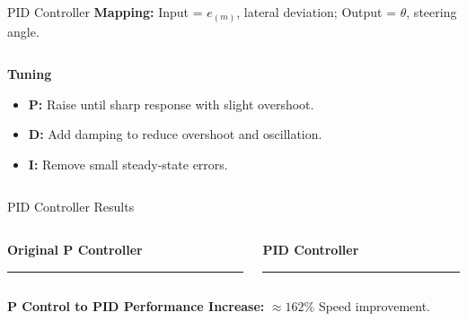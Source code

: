 \documentclass[aspectratio=169,12pt]{beamer}
\begin{document}
\begin{frame}[t]{PID Controller}
  \vspace*{-0.3em}
  \textbf{Mapping:} Input = \(e_{(m)}\), lateral deviation; Output = \(\theta\), steering angle.
  \vspace{0.4em}
  \begin{columns}[T]
    \begin{column}{0.52\textwidth}
      \textbf{Tuning}
      \begin{itemize}\setlength{\itemsep}{0.35em}
        \item \textbf{P:} Raise until sharp response with slight overshoot.
        \item \textbf{D:} Add damping to reduce overshoot and oscillation.
        \item \textbf{I:} Remove small steady-state errors.
      \end{itemize}

    \end{column}
    \begin{column}{0.48\textwidth}
      \centering

    \end{column}
  \end{columns}
\end{frame}

\begin{frame}[t]{PID Controller Results}
  \begin{columns}[T]
    \begin{column}{0.5\textwidth}
      \centering
      \textbf{Original P Controller} \\
      \vspace{0.3em}
      \rule{0pt}{5.5cm}\rule{0.9\linewidth}{0pt} %
    \end{column}

    \begin{column}{0.5\textwidth}
      \centering
      \textbf{PID Controller} \\
      \vspace{0.3em}
      \rule{0pt}{5.5cm}\rule{0.9\linewidth}{0pt} %
    \end{column}
  \end{columns}

  \vspace{0.6em}
  \centering
  \textbf{P Control to PID Performance Increase:} \(\approx162  \%\) Speed improvement.
\end{frame}
\end{document}
